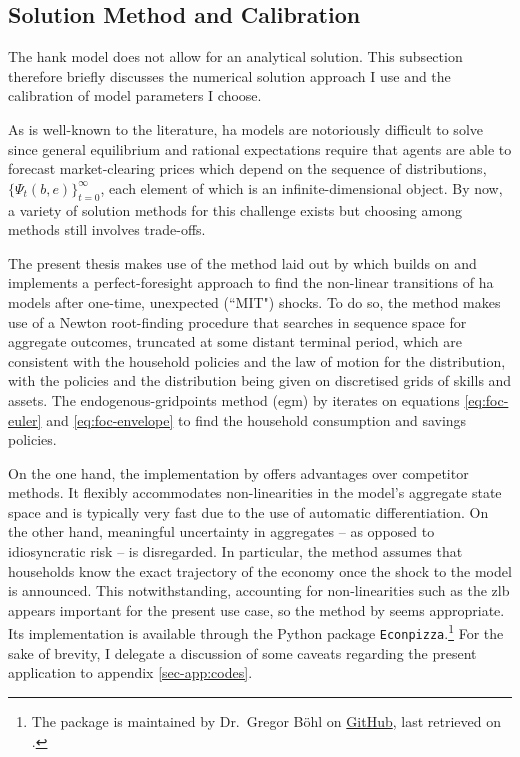 \documentclass[a4paper,12pt]{article} %
\numberwithin{equation}{section} %
\numberwithin{figure}{section}
\numberwithin{table}{section}
\begin{document}
\subsection{Solution Method and Calibration}
\label{sec:model-solution}

The \Gls{hank} model does not allow for an analytical solution. This subsection therefore briefly discusses the numerical solution approach I use and the calibration of model parameters I choose.

As is well-known to the literature, \Gls{ha} models are notoriously difficult to solve since general equilibrium and rational expectations require that agents are able to forecast market-clearing prices which depend on the sequence of distributions, $\{ \Psi_t (b,e) \}_{t=0}^{\infty} $, each element of which is an infinite-dimensional object. By now, a variety of solution methods for this challenge exists but choosing among methods still involves trade-offs. 

The present thesis makes use of the method laid out by \textcite{boehl2023econpizza} which builds on \textcite{auclert2021} and implements a perfect-foresight approach to find the non-linear transitions of \Gls{ha} models after one-time, unexpected (``MIT") shocks. To do so, the method makes use of a Newton root-finding procedure that searches in sequence space for aggregate outcomes, truncated at some distant terminal period, which are consistent with the household policies and the law of motion for the distribution, with the policies and the distribution being given on discretised grids of skills and assets. The endogenous-gridpoints method (\Gls{egm}) by \textcite{carroll2006} iterates on equations \eqref{eq:foc-euler} and \eqref{eq:foc-envelope} to find the household consumption and savings policies.

On the one hand, the implementation by \textcite{boehl2023econpizza} offers advantages over competitor methods. It flexibly accommodates non-linearities in the model's aggregate state space and is typically very fast due to the use of automatic differentiation. On the other hand, meaningful uncertainty in aggregates -- as opposed to idiosyncratic risk -- is disregarded. In particular, the method assumes that households know the exact trajectory of the economy once the shock to the model is announced. This notwithstanding, accounting for non-linearities such as the \Gls{zlb} appears important for the present use case, so the method by \textcite{boehl2023econpizza} seems appropriate. Its implementation is available through the Python package \texttt{Econpizza}.\footnote{The package is maintained by Dr.~Gregor Böhl on \href{https://github.com/gboehl/econpizza}{GitHub}, last retrieved on .} For the sake of brevity, I delegate a discussion of some caveats regarding the present application to appendix \ref{sec-app:codes}.
\end{document}
